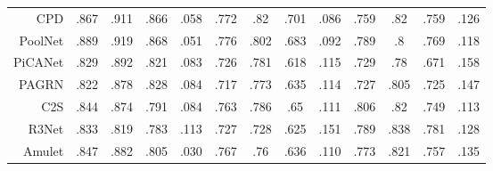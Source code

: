 \begin{table}[]
{\begin{tabular}{rcccccccccccc}
			CPD  \cite{wu2019cascaded}
			& .867 & .911 & .866 & .058 
			& .772 & .82  & .701 & .086 
			& .759 & .82  & .759 & .126 \\
			
			PoolNet \cite{liu2019simple}
			& .889 & .919 & .868 & .051 
			& .776 & .802 & .683 & .092 
			& .789 & .8   & .769 & .118 \\
			
			PiCANet \cite{liu2018picanet}
			& .829 & .892 & .821 & .083 
			& .726 & .781 & .618 & .115 
			& .729 & .78  & .671 & .158 \\
			
			PAGRN \cite{wang2018detect}
			& .822 & .878 & .828 & .084 
			& .717 & .773 & .635 & .114 
			& .727 & .805 & .725 & .147 \\
			
			C2S   \cite{li2018contour}
			& .844 & .874 & .791 & .084 
			& .763 & .786 & .65  & .111 
			& .806 & .82  & .749 & .113 \\
			
			R3Net  \cite{deng2018r3net}
			& .833 & .819 & .783 & .113 
			& .727 & .728 & .625 & .151 
			& .789 & .838 & .781 & .128 \\
			
			Amulet \cite{zhang2017amulet}
			& .847 & .882 & .805 & .030 
			& .767 & .76  & .636 & .110  
			& .773 & .821 & .757 & .135 \\
			
			
			\bottomrule %
		\end{tabular}
	}
\end{table}





